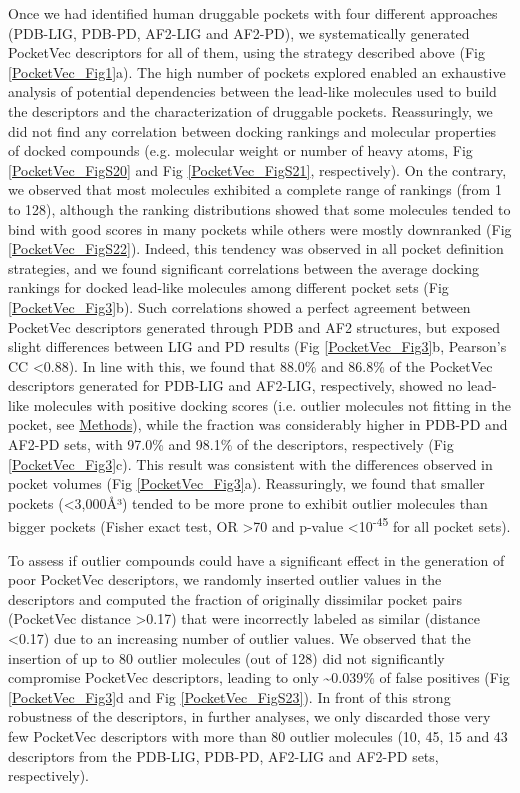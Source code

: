 Once we had identified human druggable pockets with four different approaches (PDB-LIG, PDB-PD, AF2-LIG and AF2-PD), we systematically generated PocketVec descriptors for all of them, using the strategy described above (Fig \ref{PocketVec_Fig1}a). The high number of pockets explored enabled an exhaustive analysis of potential dependencies between the lead-like molecules used to build the descriptors and the characterization of druggable pockets. Reassuringly, we did not find any correlation between docking rankings and molecular properties of docked compounds (e.g. molecular weight or number of heavy atoms, Fig \ref{PocketVec_FigS20} and Fig \ref{PocketVec_FigS21}, respectively). On the contrary, we observed that most molecules exhibited a complete range of rankings (from 1 to 128), although the ranking distributions showed that some molecules tended to bind with good scores in many pockets while others were mostly downranked (Fig \ref{PocketVec_FigS22}). Indeed, this tendency was observed in all pocket definition strategies, and we found significant correlations between the average docking rankings for docked lead-like molecules among different pocket sets (Fig \ref{PocketVec_Fig3}b). Such correlations showed a perfect agreement between PocketVec descriptors generated through PDB and AF2 structures, but exposed slight differences between LIG and PD results (Fig \ref{PocketVec_Fig3}b, Pearson’s CC <0.88). In line with this, we found that 88.0\% and 86.8\% of the PocketVec descriptors generated for PDB-LIG and AF2-LIG, respectively, showed no lead-like molecules with positive docking scores (i.e. outlier molecules not fitting in the pocket, see \hyperref[PocketVec_Methods]{Methods}), while the fraction was considerably higher in PDB-PD and AF2-PD sets, with 97.0\% and 98.1\% of the descriptors, respectively (Fig \ref{PocketVec_Fig3}c). This result was consistent with the differences observed in pocket volumes (Fig \ref{PocketVec_Fig3}a). Reassuringly, we found that smaller pockets (<3,000Å³) tended to be more prone to exhibit outlier molecules than bigger pockets (Fisher exact test, OR >70 and p-value <10\textsuperscript{-45} for all pocket sets).

To assess if outlier compounds could have a significant effect in the generation of poor PocketVec descriptors, we randomly inserted outlier values in the descriptors and computed the fraction of originally dissimilar pocket pairs (PocketVec distance >0.17) that were incorrectly labeled as similar (distance <0.17) due to an increasing number of outlier values. We observed that the insertion of up to 80 outlier molecules (out of 128) did not significantly compromise PocketVec descriptors, leading to only \textasciitilde0.039\% of false positives (Fig \ref{PocketVec_Fig3}d and Fig \ref{PocketVec_FigS23}). In front of this strong robustness of the descriptors, in further analyses, we only discarded those very few PocketVec descriptors with more than 80 outlier molecules (10, 45, 15 and 43 descriptors from the PDB-LIG, PDB-PD, AF2-LIG and AF2-PD sets, respectively). 

